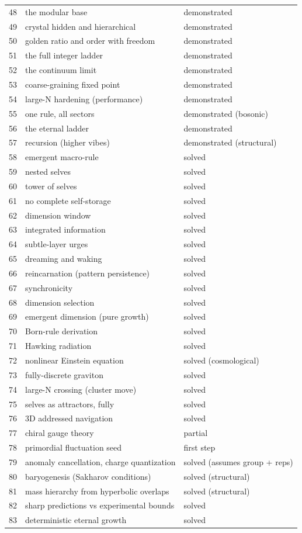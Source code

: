 \begin{center}
\begin{longtable}{r p{} l}
48 & the modular base & demonstrated \\
49 & crystal hidden and hierarchical & demonstrated \\
50 & golden ratio and order with freedom & demonstrated \\
51 & the full integer ladder & demonstrated \\
52 & the continuum limit & demonstrated \\
53 & coarse-graining fixed point & demonstrated \\
54 & large-N hardening (performance) & demonstrated \\
55 & one rule, all sectors & demonstrated (bosonic) \\
56 & the eternal ladder & demonstrated \\
57 & recursion (higher vibes) & demonstrated (structural) \\
58 & emergent macro-rule & solved \\
59 & nested selves & solved \\
60 & tower of selves & solved \\
61 & no complete self-storage & solved \\
62 & dimension window & solved \\
63 & integrated information & solved \\
64 & subtle-layer urges & solved \\
65 & dreaming and waking & solved \\
66 & reincarnation (pattern persistence) & solved \\
67 & synchronicity & solved \\
68 & dimension selection & solved \\
69 & emergent dimension (pure growth) & solved \\
70 & Born-rule derivation & solved \\
71 & Hawking radiation & solved \\
72 & nonlinear Einstein equation & solved (cosmological) \\
73 & fully-discrete graviton & solved \\
74 & large-N crossing (cluster move) & solved \\
75 & selves as attractors, fully & solved \\
76 & 3D addressed navigation & solved \\
77 & chiral gauge theory & partial \\
78 & primordial fluctuation seed & first step \\
79 & anomaly cancellation, charge quantization & solved (assumes group + reps) \\
80 & baryogenesis (Sakharov conditions) & solved (structural) \\
81 & mass hierarchy from hyperbolic overlaps & solved (structural) \\
82 & sharp predictions vs experimental bounds & solved \\
83 & deterministic eternal growth & solved \\
\end{longtable}
\end{center}

